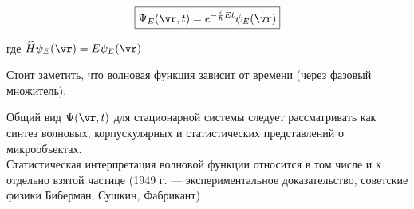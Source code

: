 $$\boxed{\Psi_E(\vr,t) = e^{-\frac{i}{\hbar}Et} \psi_E(\vr)}$$

где $\widehat{H} \psi_E(\vr) = E\psi_E(\vr)$

Стоит заметить, что волновая функция зависит от времени (через фазовый множитель).

Общий вид $\Psi(\vr,t)$ для стационарной системы следует рассматривать как синтез волновых, корпускулярных и статистических представлений о микрообъектах. \\

Статистическая интерпретация волновой функции относится в том числе и к отдельно взятой частице (1949 г. — экспериментальное доказательство, советские физики Биберман, Сушкин, Фабрикант)

